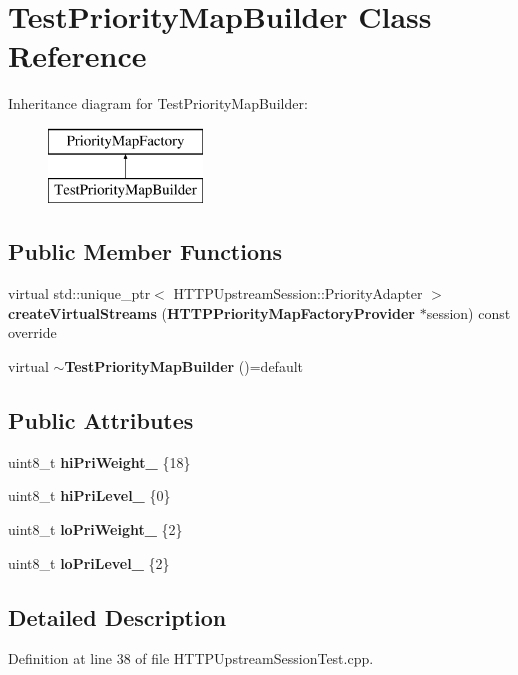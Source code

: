 \section{Test\+Priority\+Map\+Builder Class Reference}
\label{classTestPriorityMapBuilder}
Inheritance diagram for Test\+Priority\+Map\+Builder\+:\begin{figure}[H]
\begin{center}
\leavevmode
\includegraphics[height=2.000000cm]{classTestPriorityMapBuilder}
\end{center}
\end{figure}
\subsection*{Public Member Functions}
\begin{DoxyCompactItemize}
\item 
virtual std\+::unique\+\_\+ptr$<$ H\+T\+T\+P\+Upstream\+Session\+::\+Priority\+Adapter $>$ {\bf create\+Virtual\+Streams} ({\bf H\+T\+T\+P\+Priority\+Map\+Factory\+Provider} $\ast$session) const override
\item 
virtual {\bf $\sim$\+Test\+Priority\+Map\+Builder} ()=default
\end{DoxyCompactItemize}
\subsection*{Public Attributes}
\begin{DoxyCompactItemize}
\item 
uint8\+\_\+t {\bf hi\+Pri\+Weight\+\_\+} \{18\}
\item 
uint8\+\_\+t {\bf hi\+Pri\+Level\+\_\+} \{0\}
\item 
uint8\+\_\+t {\bf lo\+Pri\+Weight\+\_\+} \{2\}
\item 
uint8\+\_\+t {\bf lo\+Pri\+Level\+\_\+} \{2\}
\end{DoxyCompactItemize}


\subsection{Detailed Description}


Definition at line 38 of file H\+T\+T\+P\+Upstream\+Session\+Test.\+cpp.



